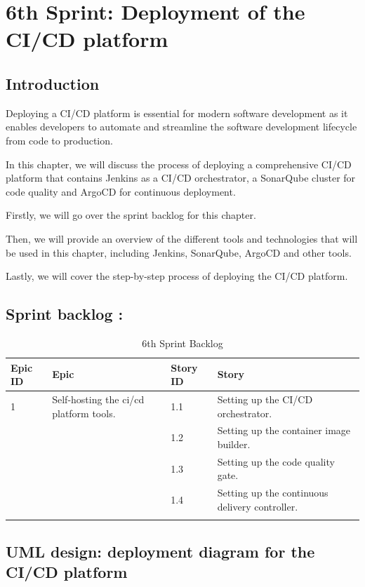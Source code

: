 \graphicspath{{./assets/}}
\setcounter{mtc}{8}
\chapter{6th Sprint: Deployment of the CI/CD platform }

\minitoc
\newpage
\section*{Introduction}
Deploying a CI/CD platform is essential for modern software development as it enables developers to automate and streamline the software development lifecycle from code to production. 

In this chapter, we will discuss the process of deploying a comprehensive CI/CD platform that contains Jenkins as a CI/CD orchestrator, a SonarQube cluster for code quality and ArgoCD for continuous deployment. 

Firstly, we will go over the sprint backlog for this chapter. 

Then, we will provide an overview of the different tools and technologies that will be used in this chapter, including Jenkins, SonarQube, ArgoCD and other tools. 

Lastly, we will cover the step-by-step process of deploying the CI/CD platform. 

\section{Sprint backlog :}

\begin{longtable}[H]{|m{1.5cm}|m{3cm}|m{1.5cm}|m{9cm}|}
\hline
{\textbf{Epic ID}} & {\textbf{Epic}} & {\textbf{Story ID}} & {\textbf{Story}}\\
\hline
1  & Self-hosting the ci/cd platform tools.  &  1.1	 & Setting up the CI/CD orchestrator.\\
\cline{3-4}
& & 1.2 & Setting up the container image builder. \\
\cline{3-4}
& & 1.3	& Setting up the code quality gate. \\
\cline{3-4}
& & 1.4	& Setting up the continuous delivery controller. \\
\cline{3-4}
\hline
\caption{6th Sprint Backlog}
\end{longtable}

\section{UML design: deployment diagram for the CI/CD platform} 

